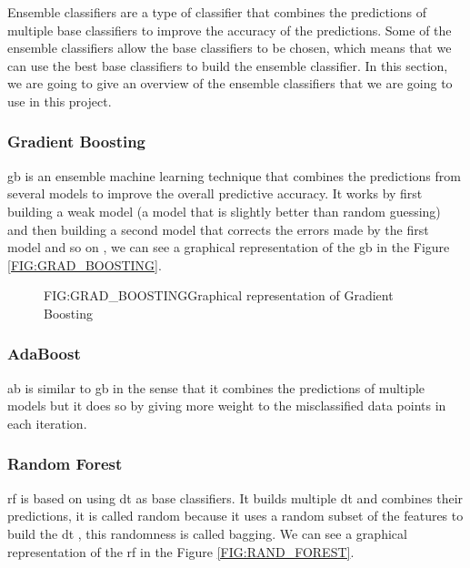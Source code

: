 Ensemble classifiers are a type of classifier that combines the predictions of multiple base classifiers to improve the accuracy of the predictions. Some of the ensemble classifiers allow the base classifiers to be chosen, which means that we can use the best base classifiers to build the ensemble classifier. In this section, we are going to give an overview of the ensemble classifiers that we are going to use in this project.



\subsubsection{Gradient Boosting}
\ac{gb} is an ensemble machine learning technique that combines the predictions from several models to improve the overall predictive accuracy. It works by first building a weak model (a model that is slightly better than random guessing) and then building a second model that corrects the errors made by the first model and so on \cite{natekin_gradient_2013}, we can see a graphical representation of the \ac{gb} in the Figure \ref{FIG:GRAD_BOOSTING}.


\begin{figure}[Gradient Boosting]{FIG:GRAD_BOOSTING}{Graphical representation of Gradient Boosting \cite{hemashreekilari_understanding_2023-3}}
\end{figure}

\subsubsection{AdaBoost}
\ac{ab} is similar to \ac{gb} in the sense that it combines the predictions of multiple models but it does so by giving more weight to the misclassified data points in each iteration.

\subsubsection{Random Forest}
\ac{rf} is based on using \ac{dt} as base classifiers. It builds multiple \ac{dt} and combines their predictions, it is called random because it uses a random subset of the features to build the \ac{dt} \cite{breiman_random_2001}, this randomness is called bagging. We can see a graphical representation of the \ac{rf} in the Figure \ref{FIG:RAND_FOREST}.


